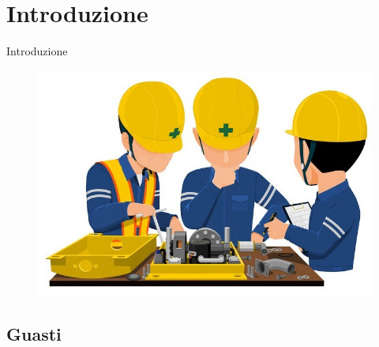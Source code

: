\footnotesize

\section{Introduzione}

	\begin{frame}
		\begin{center}
			\LARGE{Introduzione}
		\end{center}
		\begin{center}
			\begin{figure}
				\includegraphics[width=.7\textwidth]{img/guasto}
			\end{figure}
		\end{center}
	\end{frame}

	\subsection{Guasti}
	
		
